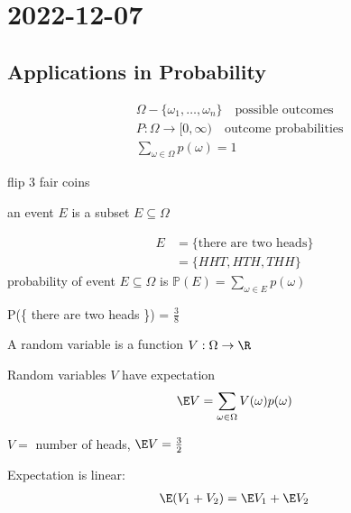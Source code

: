 \section{2022-12-07}

\subsection{Applications in Probability}

\begin{definition}
	\begin{align*}
		&\Omega - \{ \omega_1, \ldots , \omega_n \} \quad \text{possible outcomes} \\
		&P : \Omega \to [0,\infty) \quad \text{outcome probabilities} \\
		&\sum_{\omega \in \Omega} p(\omega) = 1
	\end{align*} 
\end{definition}

\begin{example}
	flip 3 fair coins
\end{example}

an event $E$ is a subset $E \subseteq \Omega$

\begin{example}
	\begin{align*}
		E &= \{ \text{there are two heads} \} \\
		  &= \{HHT, HTH, THH\}
	\end{align*} 
	probability of event $E \subseteq \Omega$ is $\mathbb{P}(E) = \sum_{\omega \in E} p(\omega)$
\end{example}

\begin{example}
	P(\{ there are two heads \}) = $\frac{3}{8}$
\end{example}

\begin{definition}
	A random variable is a function $V : \Omega \to \R$

	Random variables  $V$ have expectation 
	 \begin{align*}
		\E V = \sum_{\omega \in \Omega} V(\omega) p(\omega)
	\end{align*} 
\end{definition}

\begin{example}
	$V =$ number of heads, $\E V = \frac{3}{2}$
\end{example}

Expectation is linear:
\begin{align*}
	\E (V_1 + V_2) = \E V_1 + \E V_2
\end{align*} 

